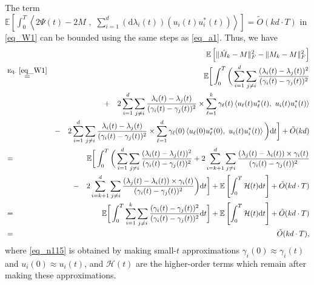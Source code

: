 \documentclass[11pt,letterpaper]{article}
\begin{document}
\begin{enumerate}
\noindent
  The term $\mathbb{E}\left[  \int_{0}^{T}   \left \langle  2 \Psi(t) - 2M   \, \, , \, \,   \sum_{i=1}^d  (\mathrm{d}\lambda_i(t)) (u_i(t) u_i^\ast(t))     \right \rangle \right ] = \tilde{O}(kd \cdot T)$ in \eqref{eq_W1} can be bounded using the same steps as \eqref{eq_a1}.  Thus, we have
 \begin{eqnarray}
& &\!\!\!\!\!\!\!\!\!\!\!\!\!\!\!\!\!\!\!\!\!\!\!\!\!\!\!\!\!\!\!\!\!\!\! \mathbb{E}\left[ \|\hat{M}_k - M\|_F^2 - \|M_k - M\|_F^2 \right]\nonumber\\ 
 &\stackrel{\textrm{Eq. } \eqref{eq_W1}}{=}& \mathbb{E}\bigg[ \int_{0}^{T} \bigg(   \sum_{i=1}^{d}  \sum_{j \neq i}  \frac{(\lambda_i(t) - \lambda_j(t))^2}{(\gamma_i(t) - \gamma_j(t))^2}  \nonumber\\
 && + \quad 2\sum_{i=1}^{d} \sum_{j\neq i} \frac{\lambda_i(t) - \lambda_j(t)}{(\gamma_i(t) - \gamma_j(t))^2} \times \sum_{\ell=1}^k \gamma_\ell(t)  \left \langle u_{\ell}(t) u_{\ell}^\ast(t) , \, \,   u_i(t) u_i^\ast(t) \right \rangle \nonumber\\ 
 && - \quad 2\sum_{i=1}^{d} \sum_{j\neq i} \frac{\lambda_i(t) - \lambda_j(t)}{(\gamma_i(t) - \gamma_j(t))^2} \times \sum_{\ell=1}^d \gamma_\ell(0)  \left \langle u_{\ell}(0) u_{\ell}^\ast(0), \, \, u_i(t) u_i^\ast(t) \right \rangle \bigg ) \mathrm{d}t \bigg] + \tilde{O}(kd)  \nonumber\\
%
 &=& \mathbb{E}\bigg[ \int_{0}^{T}  \bigg( \sum_{i=1}^{d}  \sum_{j \neq i}  \frac{(\lambda_i(t) - \lambda_j(t))^2}{(\gamma_i(t) - \gamma_j(t))^2}     + 2\sum_{i=k+1}^{d} \sum_{j\neq i} \frac{(\lambda_j(t)-\lambda_i(t)) \times \gamma_i(t)  }{(\gamma_i(t) - \gamma_j(t))^2} \nonumber \\
&& - \quad    2\sum_{i=k+1}^{d} \sum_{j\neq i} \frac{(\lambda_j(t)-\lambda_i(t)) \times \gamma_i(t)  }{(\gamma_i(t) - \gamma_j(t))^2} \bigg) \mathrm{d}t\bigg ] + \mathbb{E}\left[\int_0^T \mathcal{H}(t)\mathrm{d}t\right] + \tilde{O}(kd \cdot T)  \label{eq_n115}\\
 &=& \mathbb{E}\bigg[  \int_{0}^{T}   \sum_{i=1}^{k}  \sum_{j \neq i}  \frac{(\gamma_i(t) - \gamma_j(t))^2}{(\gamma_i(t) - \gamma_j(t))^2}  \mathrm{d}t \bigg]  + \mathbb{E}\left[\int_0^T \mathcal{H}(t)\mathrm{d}t\right] + \tilde{O}(kd \cdot T)  \nonumber\\
 &=& \tilde{O}(kd \cdot T),  \label{eq_n116}
 \end{eqnarray}
 where \eqref{eq_n115} is obtained by making small-$t$ approximations $ \gamma_i(0) \approx \gamma_i(t)$ and $u_i(0) \approx u_i(t)$, and  $\mathcal{H}(t)$ are the higher-order terms which remain after making these approximations.


\end{enumerate}
\end{document}
